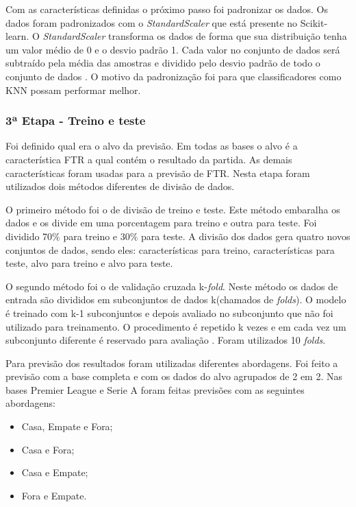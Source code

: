 	Com as características definidas o próximo passo foi padronizar os dados. Os dados foram padronizados com o \textit{StandardScaler} que está presente no Scikit-learn. O \textit{StandardScaler} transforma os dados de forma que sua distribuição tenha um valor médio de 0 e o desvio padrão 1. Cada valor no conjunto de dados será subtraído pela média das amostras e dividido pelo desvio padrão de todo o conjunto de dados \cite{StandardScaler}. O motivo da padronização foi para que classificadores como KNN possam performar melhor.
	
\subsubsection{3ª Etapa - Treino e teste}
	Foi definido qual era o alvo da previsão. Em todas as bases o alvo é a característica FTR a qual contém o resultado da partida. As demais características foram usadas para a previsão de FTR. Nesta etapa foram utilizados dois métodos diferentes de divisão de dados.
	
	O primeiro método foi o de divisão de treino e teste. Este método embaralha os dados e os divide em uma porcentagem para treino e outra para teste. Foi dividido 70\% para treino e 30\% para teste. A divisão dos dados gera quatro novos conjuntos de dados, sendo eles: características para treino, características para teste, alvo para treino e alvo para teste.
	
	O segundo método foi o de validação cruzada k-\textit{fold}. Neste método os dados de entrada são divididos em subconjuntos de dados k(chamados de \textit{folds}). O modelo é treinado com k-1 subconjuntos e depois avaliado no subconjunto que não foi utilizado para treinamento. O procedimento é repetido k vezes e em cada vez um subconjunto diferente é reservado para avaliação \cite{ValidacaoCruzada}. Foram utilizados 10 \textit{folds}.
	
	Para previsão dos resultados foram utilizadas diferentes abordagens. Foi feito a previsão com a base completa e com os dados do alvo agrupados de 2 em 2. Nas bases Premier League e Serie A foram feitas previsões com as seguintes abordagens:
	\begin{itemize}
	\item Casa, Empate e Fora;
	\item Casa e Fora;
	\item Casa e Empate;
	\item Fora e Empate.
	\end{itemize}
	
